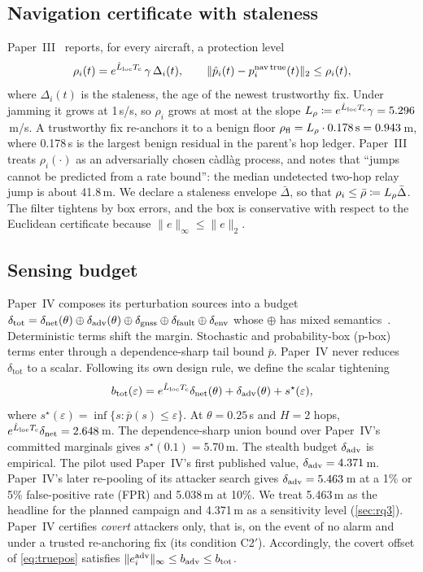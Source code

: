 \subsection{Navigation certificate with staleness}\label{sec:cert}
Paper~III~\cite{paperIII} reports, for every aircraft, a protection level
\begin{equation}\label{eq:rho}
\rho_i(t)=e^{\hat L_{\mathrm{loc}}T_{\mathrm{c}}}\,\gamma\,\Delta_i(t),\qquad \|\hat p_i(t)-p_i^{\mathrm{nav\,true}}(t)\|_2\le\rho_i(t),
\end{equation}
where $\Delta_i(t)$ is the staleness, the age of the newest trustworthy fix.
Under jamming it grows at 1\,s/s, so $\rho_i$ grows at most at the slope
$L_{\rho}\coloneqq e^{\hat L_{\mathrm{loc}}T_{\mathrm{c}}}\gamma=5.296$\,m/s. A trustworthy fix re-anchors
it to a benign floor $\rho_{\mathrm{fl}}=L_{\rho}\cdot0.178\,\text{s}=0.943$\,m, where 0.178\,s
is the largest benign residual in the parent's hop ledger. Paper~III treats
$\rho_i(\cdot)$ as an adversarially chosen c\`adl\`ag process, and notes that
``jumps cannot be predicted from a rate bound'': the median undetected
two-hop relay jump is about 41.8\,m. We declare a staleness envelope
$\bar\Delta$, so that $\rho_i\le\bar\rho\coloneqq L_{\rho}\bar\Delta$. The
filter tightens by box errors, and the box is conservative with respect to
the Euclidean certificate because $\|e\|_\infty\le\|e\|_2$.

\subsection{Sensing budget}\label{sec:budget}
Paper~IV composes its perturbation sources into a budget
$\delta_{\mathrm{tot}}=\delta_{\mathrm{net}}(\theta)\oplus\delta_{\mathrm{adv}}(\theta)\oplus\delta_{\mathrm{gnss}}\oplus\delta_{\mathrm{fault}}\oplus\delta_{\mathrm{env}}$
whose $\oplus$ has mixed semantics~\cite{paperIV}. Deterministic terms shift the
margin. Stochastic and probability-box (p-box) terms enter through a
dependence-sharp tail bound $\bar p$. Paper~IV never reduces
$\delta_{\mathrm{tot}}$ to a scalar. Following its own design rule, we define the
scalar tightening
\begin{equation}\label{eq:btot}
b_{\mathrm{tot}}(\varepsilon)=e^{\hat L_{\mathrm{loc}}T_{\mathrm{c}}}\delta_{\mathrm{net}}(\theta)+\delta_{\mathrm{adv}}(\theta)+s^\star(\varepsilon),
\end{equation}
where $s^\star(\varepsilon)=\inf\{s:\bar p(s)\le\varepsilon\}$.
At $\theta=0.25$\,s and $H=2$ hops, $e^{\hat L_{\mathrm{loc}}T_{\mathrm{c}}}\delta_{\mathrm{net}}=2.648$\,m. The
dependence-sharp union bound over Paper~IV's committed marginals gives
$s^\star(0.1)=5.70$\,m. The stealth budget $\delta_{\mathrm{adv}}$ is empirical. The pilot used
Paper~IV's first published value, $\delta_{\mathrm{adv}}=4.371$\,m. Paper~IV's later
re-pooling of its attacker search gives $\delta_{\mathrm{adv}}=5.463$\,m at a 1\% or 5\%
false-positive rate (FPR) and 5.038\,m at 10\%. We treat 5.463\,m as the
headline for the planned campaign and 4.371\,m as a sensitivity level
(\cref{sec:rq3}). Paper~IV certifies \emph{covert} attackers only, that is, on
the event of no alarm and under a trusted re-anchoring fix (its condition
C2$'$). Accordingly, the covert offset of \cref{eq:truepos} satisfies
$\|e_i^{\mathrm{adv}}\|_\infty\le b_{\mathrm{adv}}\le b_{\mathrm{tot}}$.

